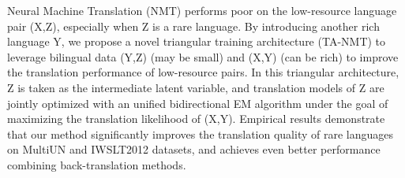 Neural Machine Translation (NMT) performs poor on the low-resource language pair (X,Z), especially when Z is a rare language. By introducing another rich language Y, we propose a novel triangular training architecture (TA-NMT) to leverage bilingual data (Y,Z) (may be small) and (X,Y) (can be rich) to improve the translation performance of low-resource pairs. In this triangular architecture, Z is taken as the intermediate latent variable, and translation models of Z are jointly optimized with an unified bidirectional EM algorithm under the goal of maximizing the translation likelihood of (X,Y). Empirical results demonstrate that our method significantly improves the translation quality of rare languages on MultiUN and IWSLT2012 datasets, and achieves even better performance combining back-translation methods.
